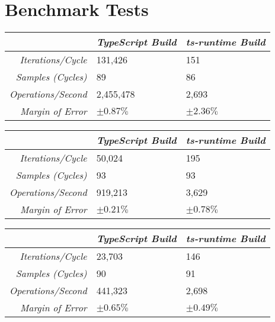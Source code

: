 \pagebreak[4]
\section{Benchmark Tests}
\label{app:sec:benchmark-results}

\enlargethispage{2\baselineskip}

\begin{center}
{
\centering
\tabulinesep=1.2mm
\setlength{\tabcolsep}{5mm}
\def\arraystretch{1.25}
\small
\begin{tabu} to \textwidth {|r||X[c,m]|X[c,m]|}
  \hline
  & \emph{TypeScript Build} & \emph{ts-runtime Build} \\
  \hline
  \hline
  \emph{Iterations/Cycle}  & 131,426 & 151 \\
  \hline
  \emph{Samples (Cycles)}  & 89 & 86 \\
  \hline
  \emph{Operations/Second} & 2,455,478 & 2,693 \\
  \hline
  \emph{Margin of Error}   & $\pm 0.87\%$ & $\pm 2.36\%$ \\
  \hline
\end{tabu}
}
\end{center}

\begin{center}
{
\centering
\tabulinesep=1.2mm
\setlength{\tabcolsep}{5mm}
\def\arraystretch{1.25}
\small
\begin{tabu} to \textwidth {|r||X[c,m]|X[c,m]|}
  \hline
  & \emph{TypeScript Build} & \emph{ts-runtime Build} \\
  \hline
  \hline
  \emph{Iterations/Cycle}  & 50,024 & 195 \\
  \hline
  \emph{Samples (Cycles)}  & 93 & 93 \\
  \hline
  \emph{Operations/Second} & 919,213 & 3,629 \\
  \hline
  \emph{Margin of Error}   & $\pm 0.21\%$ & $\pm 0.78\%$ \\
  \hline
\end{tabu}
}
\end{center}

\begin{center}
{
\centering
\tabulinesep=1.2mm
\setlength{\tabcolsep}{5mm}
\def\arraystretch{1.25}
\small
\begin{tabu} to \textwidth {|r||X[c,m]|X[c,m]|}
  \hline
  & \emph{TypeScript Build} & \emph{ts-runtime Build} \\
  \hline
  \hline
  \emph{Iterations/Cycle}  & 23,703 & 146 \\
  \hline
  \emph{Samples (Cycles)}  & 90 & 91 \\
  \hline
  \emph{Operations/Second} & 441,323 & 2,698 \\
  \hline
  \emph{Margin of Error}   & $\pm 0.65\%$ & $\pm 0.49\%$ \\
  \hline
\end{tabu}
}
\end{center}

